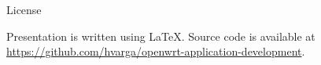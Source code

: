 \begin{withoutheadline}
    \begin{frame}{License}
        \begin{center}
            Presentation is written using \LaTeX. Source code is available at \url{https://github.com/hvarga/openwrt-application-development}.
        \end{center}
        \vfill
        \begin{center}
            \doclicenseImage
            \\
            \doclicenseLongText
        \end{center}
    \end{frame}
\end{withoutheadline}
